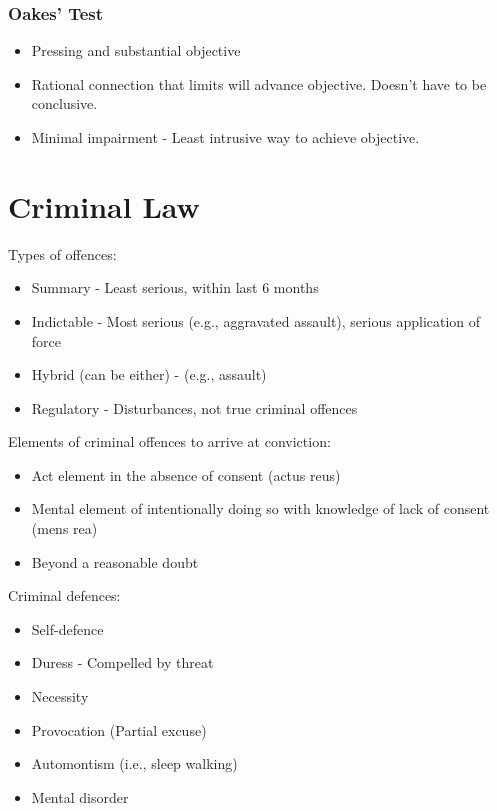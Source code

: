 \documentclass[
  letterpaper,
  landscape,
  columns=3,
  draft,
]{cheatsheet}
\begin{document}
  \subsubsection{Oakes' Test}
  \begin{itemize}
    \item Pressing and substantial objective
    \item Rational connection that limits will advance objective. Doesn't have to be conclusive.
    \item Minimal impairment - Least intrusive way to achieve objective.
  \end{itemize}

  \section{Criminal Law}
  Types of offences:
  \begin{itemize}
    \item Summary - Least serious, within last 6 months
    \item Indictable - Most serious (e.g., aggravated assault), serious application of force
    \item Hybrid (can be either) - (e.g., assault)
    \item Regulatory - Disturbances, not true criminal offences
  \end{itemize}
  Elements of criminal offences to arrive at conviction:
  \begin{itemize}
    \item Act element in the absence of consent (actus reus)
    \item Mental element of intentionally doing so with knowledge of lack of consent (mens rea)
    \item Beyond a reasonable doubt
  \end{itemize}
  Criminal defences:
  \begin{itemize}
    \item Self-defence
    \item Duress - Compelled by threat
    \item Necessity
    \item Provocation (Partial excuse)
    \item Automontism (i.e., sleep walking)
    \item Mental disorder
  \end{itemize}
\end{document}
